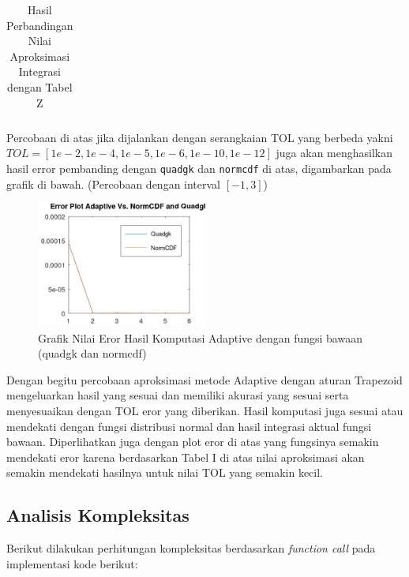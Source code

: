 \documentclass[journal,12pt,onecolumn,a4paper]{IEEEtran}
\begin{document}
\begin{enumerate}
\begin{center}
\begin{table}[H]
\begin{tabular}{c | c | c| c | c | c}
				      \bottomrule %
			      \end{tabular}
			      \smallskip
			      \caption{Hasil Perbandingan Nilai Aproksimasi Integrasi dengan Tabel Z} %
			      \label{tab: template} %
		      \end{table}
	      \end{center}
\end{enumerate}

Percobaan di atas jika dijalankan dengan serangkaian TOL yang berbeda yakni \(TOL = [1e-2,1e-4,1e-5, 1e-6, 1e-10, 1e-12]\) juga akan menghasilkan hasil error pembanding dengan \lstinline{quadgk} dan \lstinline{normcdf} di atas, digambarkan pada grafik di bawah.
(Percobaan dengan interval \([-1,3]\))

\begin{figure}[h]
	\centering
	\includegraphics[width=0.5\textwidth]{bagus_adaptive.jpg}
	\caption{Grafik Nilai Eror Hasil Komputasi Adaptive dengan fungsi bawaan (quadgk dan normcdf)}
	\label{fig:difGraphAdaptive}
\end{figure}

Dengan begitu percobaan aproksimasi metode Adaptive dengan aturan Trapezoid mengeluarkan hasil yang sesuai dan memiliki akurasi yang sesuai serta menyesuaikan dengan TOL eror yang diberikan. Hasil komputasi juga sesuai atau mendekati dengan fungsi distribusi normal dan hasil integrasi aktual fungsi bawaan. Diperlihatkan juga dengan plot eror di atas yang fungsinya semakin mendekati eror karena berdasarkan Tabel I di atas nilai aproksimasi akan semakin mendekati hasilnya untuk nilai TOL yang semakin kecil.

\subsection{Analisis Kompleksitas}
Berikut dilakukan perhitungan kompleksitas berdasarkan \emph{function call} pada implementasi kode berikut:
\end{document}
